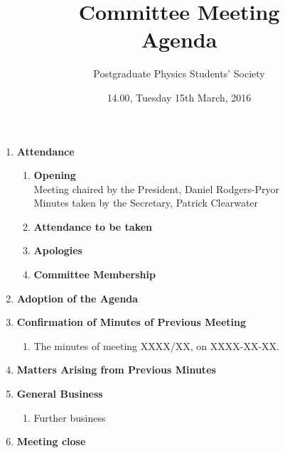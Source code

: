 \documentclass[a4paper,12pt]{article}
\title{Committee Meeting\\Agenda}
\author{Postgraduate Physics Students' Society}
\date{14.00, Tuesday 15th March, 2016}
\newcommand{\itemi}[1]{\bf\large #1}
\newcommand{\itemii}[1]{\bf #1}
\begin{document}
\thispagestyle{empty}\pagestyle{empty}
\maketitle
\begin{enumerate}
\item {\itemi Attendance}
	\begin{enumerate}
	\item {\itemii Opening}\\
	Meeting chaired by the President, Daniel Rodgers-Pryor\\
	Minutes taken by the Secretary, Patrick Clearwater
	\item {\itemii Attendance to be taken}
	\item {\itemii Apologies}
	\item {\itemii Committee Membership}
	\end{enumerate}
\item {\itemi Adoption of the Agenda}
\item {\itemi Confirmation of Minutes of Previous Meeting}
	\begin{enumerate}
	\item The minutes of meeting XXXX/XX, on XXXX-XX-XX.
	\end{enumerate}
\item {\itemi Matters Arising from Previous Minutes}
\item {\itemi General Business}
	\begin{enumerate}
	\item Further business
	\end{enumerate}
\item {\itemi Meeting close}
\end{enumerate}
\end{document}
